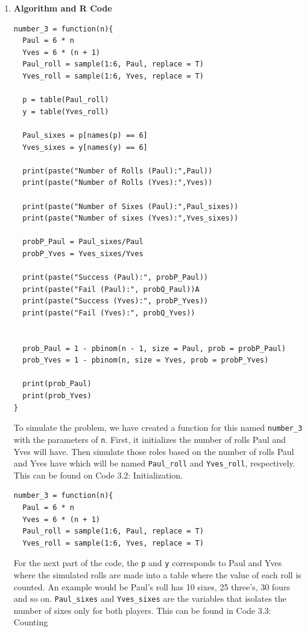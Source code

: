 \documentclass[12pt,letterpaper]{article}
\newcommand{\code}[1]{\colorbox{light-gray}{\texttt{#1}}}
\begin{document}
    \begin{enumerate}[label=\Alph*]

      \item \textbf{Algorithm and R Code}
        \begin{lstlisting}[title=\footnotesize Code 3.1: The Entire Code]
number_3 = function(n){
  Paul = 6 * n
  Yves = 6 * (n + 1)
  Paul_roll = sample(1:6, Paul, replace = T)
  Yves_roll = sample(1:6, Yves, replace = T)
  
  p = table(Paul_roll)
  y = table(Yves_roll)
  
  Paul_sixes = p[names(p) == 6]
  Yves_sixes = y[names(y) == 6]
  
  print(paste("Number of Rolls (Paul):",Paul))
  print(paste("Number of Rolls (Yves):",Yves))
  
  print(paste("Number of Sixes (Paul):",Paul_sixes))
  print(paste("Number of sixes (Yves):",Yves_sixes))
  
  probP_Paul = Paul_sixes/Paul
  probP_Yves = Yves_sixes/Yves
  
  print(paste("Success (Paul):", probP_Paul))
  print(paste("Fail (Paul):", probQ_Paul))A
  print(paste("Success (Yves):", probP_Yves))
  print(paste("Fail (Yves):", probQ_Yves))
  
  
  prob_Paul = 1 - pbinom(n - 1, size = Paul, prob = probP_Paul)
  prob_Yves = 1 - pbinom(n, size = Yves, prob = probP_Yves)
  
  print(prob_Paul)
  print(prob_Yves)
}
        \end{lstlisting}
      
        \newpage
        To simulate the problem, we have created a function for this named \code{number\_3} with the parameters of \code{n}. First, it initializes the number of rolls Paul and Yves will have. Then simulate those roles based on the number of rolls Paul and Yves have which will be named \code{Paul\_roll} and \code{Yves\_roll}, respectively. This can be found on Code 3.2: Initialization.

          \begin{lstlisting}[title=\footnotesize Code 3.2: Initialization]
number_3 = function(n){
  Paul = 6 * n
  Yves = 6 * (n + 1)
  Paul_roll = sample(1:6, Paul, replace = T)
  Yves_roll = sample(1:6, Yves, replace = T)
          \end{lstlisting}

        For the next part of the code, the \code{p} and \code{y} corresponds to Paul and Yves where the simulated rolls are made into a table where the value of each roll is counted. An example would be Paul’s roll has 10 sixes, 25 three’s, 30 fours and so on. \code{Paul\_sixes} and \code{Yves\_sixes} are the variables that isolates the number of sixes only for both players. This can be found in Code 3.3: Counting


\end{enumerate}
\end{document}
